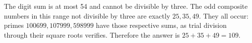 The digit sum is at most 54 and cannot be divisible by three. The odd composite numbers in this range not divisible by three are exactly $25,35,49$. They all occur: primes $100699,107999,598999$ have those respective sums, as trial division through their square roots verifies. Therefore the answer is $\boxed{25+35+49=109}$.
